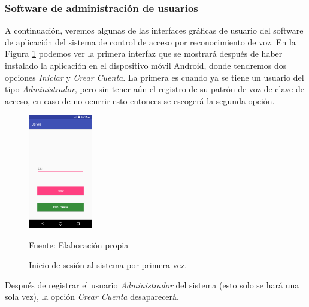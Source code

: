 \subsubsection{Software de administración de usuarios}
A continuación, veremos algunas de las interfaces gráficas de usuario del software de aplicación del sistema de control de acceso por reconocimiento de voz. En la Figura \ref{fig:figura3.35} podemos ver la primera interfaz que se mostrará después de haber instalado la aplicación en el dispositivo móvil Android, donde tendremos dos opciones \textit{Iniciar} y \textit{Crear Cuenta}. La primera es cuando ya se tiene un usuario del tipo \textit{Administrador}, pero sin tener aún el registro de su patrón de voz de clave de acceso, en caso de no ocurrir esto entonces se escogerá la segunda opción.
\begin{figure}[H]
\captionsetup{justification=centering}
\begin{center}
\includegraphics[width=0.25\textwidth]{Imagenes/Cap3/image035}
\end{center}
\begin{center}
\vskip -0.5cm
\caption{\small{Inicio de sesión al sistema por primera vez.}}
\label{fig:figura3.35}
{\small{Fuente: Elaboración propia}}
\end{center}
\end{figure}

Después de registrar el usuario \textit{Administrador} del sistema (esto solo se hará una sola vez), la opción \textit{Crear Cuenta} desaparecerá.

